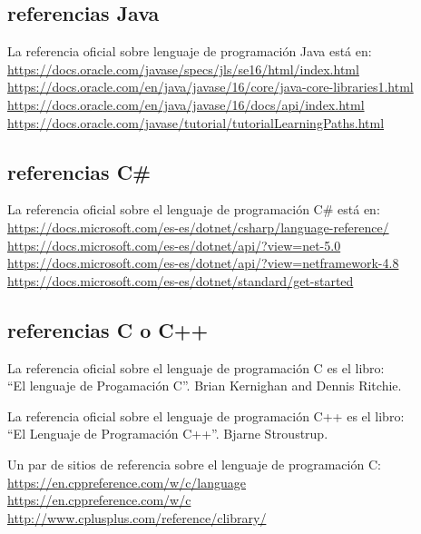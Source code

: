 \documentclass[spanish,12pt,a4paper,final,oneside]{book}
\begin{document}
\subsection{referencias Java}

La referencia oficial sobre lenguaje de programación Java está en:
\\ \url{https://docs.oracle.com/javase/specs/jls/se16/html/index.html}
\\ \url{https://docs.oracle.com/en/java/javase/16/core/java-core-libraries1.html}
\\ \url{https://docs.oracle.com/en/java/javase/16/docs/api/index.html}
\\ \url{https://docs.oracle.com/javase/tutorial/tutorialLearningPaths.html}



\subsection{referencias C\#}

La referencia oficial sobre el lenguaje de programación C\# está en:
\\ \url{https://docs.microsoft.com/es-es/dotnet/csharp/language-reference/}
\\ \url{https://docs.microsoft.com/es-es/dotnet/api/?view=net-5.0}
\\ \url{https://docs.microsoft.com/es-es/dotnet/api/?view=netframework-4.8}
\\ \url{https://docs.microsoft.com/es-es/dotnet/standard/get-started}




\subsection{referencias C o C++}

La referencia oficial sobre el lenguaje de programación C es el libro:
\\ ``El lenguaje de Progamación C''. Brian Kernighan and Dennis Ritchie.

La referencia oficial sobre el lenguaje de programación C++ es el libro:
\\ ``El Lenguaje de Programación C++''. Bjarne Stroustrup.

Un par de sitios de referencia sobre el lenguaje de programación C:
\\ \url{https://en.cppreference.com/w/c/language}
\\ \url{https://en.cppreference.com/w/c}
\\ \url{http://www.cplusplus.com/reference/clibrary/}
\end{document}
